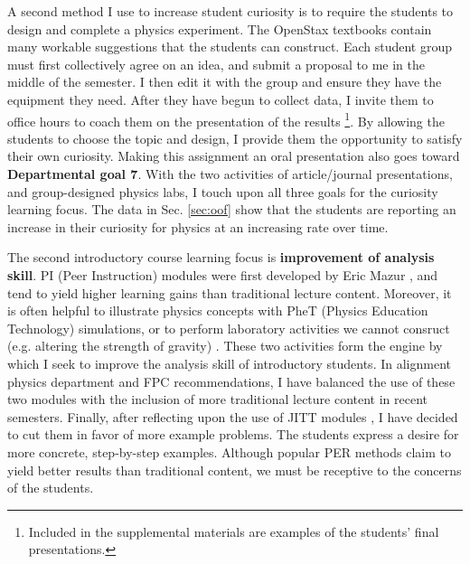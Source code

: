 \documentclass[../../../main.tex]{subfiles}
\begin{document}
A second method I use to increase student curiosity is to require the students to design and complete a physics experiment.  The OpenStax textbooks contain many workable suggestions that the students can construct.  Each student group must first collectively agree on an idea, and submit a proposal to me in the middle of the semester.  I then edit it with the group and ensure they have the equipment they need.  After they have begun to collect data, I invite them to office hours to coach them on the presentation of the results \footnote{Included in the supplemental materials are examples of the students' final presentations.}.  By allowing the students to choose the topic and design, I provide them the opportunity to satisfy their own curiosity.  Making this assignment an oral presentation also goes toward \textbf{Departmental goal 7}.  With the two activities of article/journal presentations, and group-designed physics labs, I touch upon all three goals for the curiosity learning focus.  The data in Sec. \ref{sec:oof} show that the students are reporting an increase in their curiosity for physics at an increasing rate over time. \\ \hspace{0.1cm}

The second introductory course learning focus is \textbf{improvement of analysis skill}.  PI (Peer Instruction) modules were first developed by Eric Mazur \cite{mazur2013peer}, and tend to yield higher learning gains than traditional lecture content.  Moreover, it is often helpful to illustrate physics concepts with PheT (Physics Education Technology) simulations, or to perform laboratory activities we cannot consruct (e.g. altering the strength of gravity) \cite{phet}.  These two activities form the engine by which I seek to improve the analysis skill of introductory students.  In alignment physics department and FPC recommendations, I have balanced the use of these two modules with the inclusion of more traditional lecture content in recent semesters.  Finally, after reflecting upon the use of JITT modules \cite{jitt}, I have decided to cut them in favor of more example problems.  The students express a desire for more concrete, step-by-step examples.  Although popular PER methods claim to yield better results than traditional content, we must be receptive to the concerns of the students. \\ \hspace{0.1cm}
\end{document}
